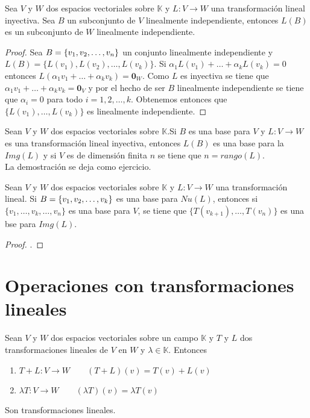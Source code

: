 \begin{theorem}
Sea $V$ y $W$ dos espacios vectoriales sobre $\mathbb{K}$ y $L : V \to W$ una transformación lineal inyectiva. Sea $B$ un subconjunto de $V$ linealmente independiente, entonces $L(B)$ es un subconjunto de $W$ linealmente independiente. 
\end{theorem}

\begin{proof}
Sea $B =  \lbrace v_1, v_2, \ldots, v_n \rbrace$ un conjunto linealmente independiente y $L(B) = \{L(v_1), L(v_2), \ldots , L(v_k)\}$. Si $\alpha_1 L(v_1) + \ldots + \alpha_k L(v_k) = 0$ entonces $L(\alpha_1 v_1 + \ldots +\alpha_k v_k) = \mathbf{0}_W$. Como $L$ es inyectiva se tiene que $\alpha_1 v_1 + \ldots + \alpha_k v_k = \mathbf{0}_V$ y por el hecho de ser $B$ linealmente independiente se tiene que $\alpha_i = 0$ para todo $i = 1, 2, \ldots , k$. Obtenemos entonces que $\{L(v_1), \ldots , L(v_k)\}$ es linealmente independiente.
\end{proof}

\begin{theorem}
Sean $V$ y $W$ dos espacios vectoriales sobre $\mathbb{K}$.Si $B$ es una base para $V$ y $L : V \to W$ es una transformación lineal inyectiva, entonces $L(B)$ es una base para la $Img(L)$ y si $V$ es de dimensión finita $n$ se tiene que $n = rango(L)$.\\

La demostración se deja como ejercicio. %
\end{theorem}

\begin{theorem}
Sean $V$ y $W$ dos espacios vectoriales sobre $\mathbb{K}$ y $L : V \to W$ una transformación lineal. Si $B =  \lbrace v_1, v_2, \ldots, v_k \rbrace$ es una base para $Nu(L)$, entonces si $\{v_1 , \ldots , v_{k}, \ldots , v_n\}$ es una base para $V$, se tiene que $\{T(v_{k+1}), \ldots , T(v_n)\}$ es una bse para $Img(L)$.
\end{theorem}

\begin{proof}
.
\end{proof}

\section{Operaciones con transformaciones lineales}
\begin{dfn}
Sean $V$ y $W$ dos espacios vectoriales sobre un campo $\mathbb{K}$ y $T$ y $L$ dos transformaciones lineales de $V$ en $W$ y $\lambda \in \mathbb{K}$. Entonces 
\begin{enumerate}
\item $T + L : V \to W \qquad (T + L)(v) = T(v) + L(v)$
\item $\lambda T : V \to W \qquad (\lambda T)(v) = \lambda T(v)$
\end{enumerate}
Son transformaciones lineales.
\end{dfn}

